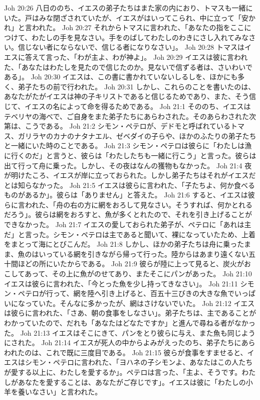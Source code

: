 Joh 20:26  八日ののち、イエスの弟子たちはまた家の内におり、トマスも一緒にいた。戸はみな閉ざされていたが、イエスがはいってこられ、中に立って「安かれ」と言われた。
Joh 20:27  それからトマスに言われた、「あなたの指をここにつけて、わたしの手を見なさい。手をのばしてわたしのわきにさし入れてみなさい。信じない者にならないで、信じる者になりなさい」。
Joh 20:28  トマスはイエスに答えて言った、「わが主よ、わが神よ」。
Joh 20:29  イエスは彼に言われた、「あなたはわたしを見たので信じたのか。見ないで信ずる者は、さいわいである」。
Joh 20:30  イエスは、この書に書かれていないしるしを、ほかにも多く、弟子たちの前で行われた。
Joh 20:31  しかし、これらのことを書いたのは、あなたがたがイエスは神の子キリストであると信じるためであり、また、そう信じて、イエスの名によって命を得るためである。
Joh 21:1  そののち、イエスはテベリヤの海べで、ご自身をまた弟子たちにあらわされた。そのあらわされた次第は、こうである。
Joh 21:2  シモン・ペテロが、デドモと呼ばれているトマス、ガリラヤのカナのナタナエル、ゼベダイの子らや、ほかのふたりの弟子たちと一緒にいた時のことである。
Joh 21:3  シモン・ペテロは彼らに「わたしは漁に行くのだ」と言うと、彼らは「わたしたちも一緒に行こう」と言った。彼らは出て行って舟に乗った。しかし、その夜はなんの獲物もなかった。
Joh 21:4  夜が明けたころ、イエスが岸に立っておられた。しかし弟子たちはそれがイエスだとは知らなかった。
Joh 21:5  イエスは彼らに言われた、「子たちよ、何か食べるものがあるか」。彼らは「ありません」と答えた。
Joh 21:6  すると、イエスは彼らに言われた、「舟の右の方に網をおろして見なさい。そうすれば、何かとれるだろう」。彼らは網をおろすと、魚が多くとれたので、それを引き上げることができなかった。
Joh 21:7  イエスの愛しておられた弟子が、ペテロに「あれは主だ」と言った。シモン・ペテロは主であると聞いて、裸になっていたため、上着をまとって海にとびこんだ。
Joh 21:8  しかし、ほかの弟子たちは舟に乗ったまま、魚のはいっている網を引きながら帰って行った。陸からはあまり遠くない五十間ほどの所にいたからである。
Joh 21:9  彼らが陸に上って見ると、炭火がおこしてあって、その上に魚がのせてあり、またそこにパンがあった。
Joh 21:10  イエスは彼らに言われた、「今とった魚を少し持ってきなさい」。
Joh 21:11  シモン・ペテロが行って、網を陸へ引き上げると、百五十三びきの大きな魚でいっぱいになっていた。そんなに多かったが、網はさけないでいた。
Joh 21:12  イエスは彼らに言われた、「さあ、朝の食事をしなさい」。弟子たちは、主であることがわかっていたので、だれも「あなたはどなたですか」と進んで尋ねる者がなかった。
Joh 21:13  イエスはそこにきて、パンをとり彼らに与え、また魚も同じようにされた。
Joh 21:14  イエスが死人の中からよみがえったのち、弟子たちにあらわれたのは、これで既に三度目である。
Joh 21:15  彼らが食事をすませると、イエスはシモン・ペテロに言われた、「ヨハネの子シモンよ、あなたはこの人たちが愛する以上に、わたしを愛するか」。ペテロは言った、「主よ、そうです。わたしがあなたを愛することは、あなたがご存じです」。イエスは彼に「わたしの小羊を養いなさい」と言われた。
